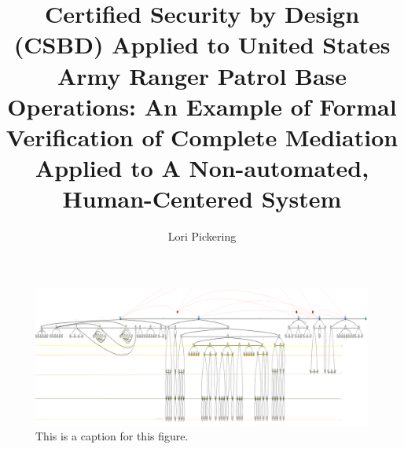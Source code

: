 \documentclass[hidelinks,12pt,a4paper]{report}
\begin{document}
\lstset{language=ML, basicstyle=\scriptsize}
\title{Certified Security by Design (CSBD) Applied to United States Army Ranger Patrol Base Operations: An Example of Formal Verification of Complete Mediation Applied to A Non-automated, Human-Centered System}
\author{Lori Pickering}

\begin{figure}[t]
\includegraphics[width=\textwidth]{../figures/overalldiagramsquashed.png}
\caption{This is a caption for this figure.}
\end{figure}

\begin{doublespace}
\cleardoublepage {}
{}

\setcounter{page}{1}
\end{doublespace}
\cleardoublepage {}

\tableofcontents
\cleardoublepage



\hypersetup{
  colorlinks   = true, %
  urlcolor     = blue, %
  linkcolor    = blue, %
  citecolor   = red %
}

\cleardoublepage {}
\listoffigures

\cleardoublepage {}
\listoftables

\cleardoublepage
%
\printnoidxglossary[type=\acronymtype, title={List of Acronyms}]
\cleardoublepage

\parskip=18pt
\raggedright
\end{document}

